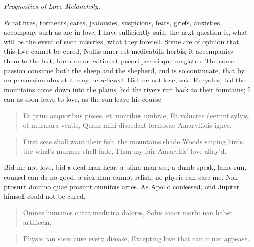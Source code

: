 
\emph{Prognostics of Love-Melancholy.} %

What fires, torments, cares, jealousies, suspicions, fears, griefs,
anxieties, accompany such as are in love, I have sufficiently said: the
next question is, what will be the event of such miseries, what they
foretell. Some are of opinion that this love cannot be cured, Nullis
amor est medicabilis herbis, it accompanies them to the last,
Idem amor exitio est pecori pecorisque magistro. The same passion
consume both the sheep and the shepherd, and is so continuate, that by
no persuasion almost it may be relieved. Bid me not love, said
Euryalus, bid the mountains come down into the plains, bid the rivers
run back to their fountains; I can as soon leave to love, as the sun
leave his course;

\begin{latin}
\begin{verse}
Et prius aequoribus pisces, et montibus umbrae,
Et volucres deerunt sylvis, et murmura ventis,
Quam mihi discedent formosae Amaryllidis ignes.
\end{verse}
\end{latin}
\translationrule%
\begin{verse}%
First seas shall want their fish, the mountains shade
Woods singing birds, the wind's murmur shall fade,
Than my fair Amaryllis' love allay'd.
\end{verse}%

Bid me not love, bid a deaf man hear, a blind man see, a dumb speak,
lame run, counsel can do no good, a sick man cannot relish, no physic
can ease me. Non prosunt domino quae prosunt omnibus artes. As Apollo
confessed, and Jupiter himself could not be cured.

\begin{latin}
\begin{verse}
Omnes humanos curat medicina dolores,
Solus amor morbi non habet artificem.
\end{verse}
\end{latin}
\translationrule%
\begin{verse}%
Physic can soon cure every disease,
Excepting love that can it not appease.
\end{verse}%

